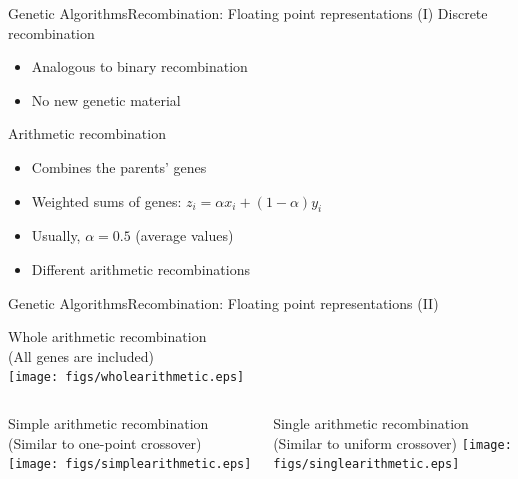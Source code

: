 \documentclass[10pt,compress]{beamer} %
\begin{document}
\begin{frame}{Genetic Algorithms}{Recombination: Floating point representations (I)}
	Discrete recombination
	\begin{itemize}
		\item Analogous to binary recombination
		\item No new genetic material
	\end{itemize}
	Arithmetic recombination
	\begin{itemize}
		\item Combines the parents' genes
		\item Weighted sums of genes: $z_i=\alpha x_i + (1-\alpha) y_i$
		\item Usually, $\alpha=0.5$ (average values)
		\item Different arithmetic recombinations
	\end{itemize}
\end{frame}

\begin{frame}{Genetic Algorithms}{Recombination: Floating point representations (II)}
	\vspace{-0.75cm}
	\begin{center}
	Whole arithmetic recombination\\
	\footnotesize{(All genes are included)}\\
	\texttt{[image: figs/wholearithmetic.eps]}\\
	\end{center}
	\vspace{-0.5cm}

    \begin{columns}
		\begin{center}
		Simple arithmetic recombination\\
		\footnotesize{(Similar to one-point crossover)}
		\texttt{[image: figs/simplearithmetic.eps]}\\
		\end{center}
		\begin{center}
		Single arithmetic recombination\\
		\footnotesize{(Similar to uniform crossover)}
		\texttt{[image: figs/singlearithmetic.eps]}\\
		\end{center}
		\end{columns}
\end{frame}
\end{document}
